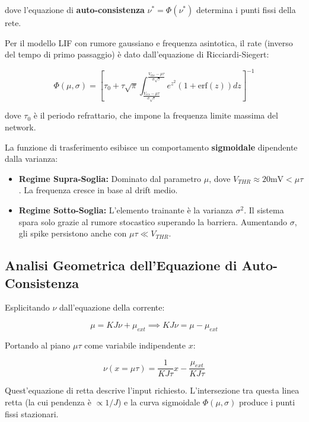 dove l'equazione di \textbf{auto-consistenza} $\nu^* = \Phi(\nu^*)$ determina i punti fissi della rete.


Per il modello LIF con rumore gaussiano e frequenza asintotica, il rate (inverso del tempo di primo passaggio) è dato dall'equazione di Ricciardi-Siegert:

\begin{equation}
\Phi(\mu, \sigma) = \left[ \tau_0 + \tau \sqrt{\pi} \int_{\frac{V_{res} - \mu\tau}{\sigma\sqrt{\tau}}}^{\frac{V_{thr} - \mu\tau}{\sigma\sqrt{\tau}}} e^{z^2} (1 + \text{erf}(z)) dz \right]^{-1}
\end{equation}

dove $\tau_0$ è il periodo refrattario, che impone la frequenza limite massima del network.


La funzione di trasferimento esibisce un comportamento \textbf{sigmoidale} dipendente dalla varianza:
\begin{itemize}
    \item \textbf{Regime Supra-Soglia:} Dominato dal parametro $\mu$, dove $V_{THR} \approx 20\text{mV} < \mu\tau$. La frequenza cresce in base al drift medio.
    \item \textbf{Regime Sotto-Soglia:} L'elemento trainante è la varianza $\sigma^2$. Il sistema spara solo grazie al rumore stocastico superando la barriera. Aumentando $\sigma$, gli spike persistono anche con $\mu\tau \ll V_{THR}$.
\end{itemize}

\subsection{Analisi Geometrica dell'Equazione di Auto-Consistenza}

Esplicitando $\nu$ dall'equazione della corrente:

\begin{equation}
\mu = K J \nu + \mu_{ext} \implies K J \nu = \mu - \mu_{ext}
\end{equation}

Portando al piano $\mu\tau$ come variabile indipendente $x$:

\begin{equation}
\nu(x=\mu\tau) = \frac{1}{K J \tau} x - \frac{\mu_{ext}}{K J \tau}
\end{equation}

Quest'equazione di retta descrive l'input richiesto. L'intersezione tra questa linea retta (la cui pendenza è $\propto 1/J$) e la curva sigmoidale $\Phi(\mu, \sigma)$ produce i punti fissi stazionari.


